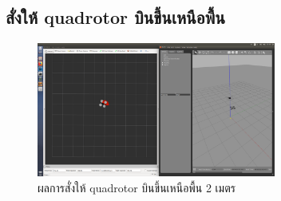 \clearpage
\subsection{สั่งให้ quadrotor บินขึ้นเหนือพื้น}
\begin{figure}[!ht]
	\centering
	\includegraphics[width=0.7\textwidth]{images/test/drone_takeoff.png}
	\caption{ผลการสั่งให้ quadrotor บินขึ้นเหนือพื้น 2 เมตร}
\end{figure}

